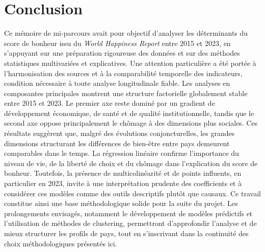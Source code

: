 \documentclass{article}
\begin{document}
\section{Conclusion}

Ce mémoire de mi-parcours avait pour objectif d’analyser les déterminants du score de bonheur issu du \textit{World Happiness Report} entre 2015 et 2023, en s’appuyant sur une préparation rigoureuse des données et sur des méthodes statistiques multivariées et explicatives. Une attention particulière a été portée à l’harmonisation des sources et à la comparabilité temporelle des indicateurs, condition nécessaire à toute analyse longitudinale fiable.
Les analyses en composantes principales montrent une structure factorielle globalement stable entre 2015 et 2023. Le premier axe reste dominé par un gradient de développement économique, de santé et de qualité institutionnelle, tandis que le second axe oppose principalement le chômage à des dimensions plus sociales. Ces résultats suggèrent que, malgré des évolutions conjoncturelles, les grandes dimensions structurant les différences de bien-être entre pays demeurent comparables dans le temps.
La régression linéaire confirme l’importance du niveau de vie, de la liberté de choix et du chômage dans l’explication du score de bonheur. Toutefois, la présence de multicolinéarité et de points influents, en particulier en 2023, invite à une interprétation prudente des coefficients et à considérer ces modèles comme des outils descriptifs plutôt que causaux.
Ce travail constitue ainsi une base méthodologique solide pour la suite du projet. Les prolongements envisagés, notamment le développement de modèles prédictifs et l’utilisation de méthodes de clustering, permettront d’approfondir l’analyse et de mieux structurer les profils de pays, tout en s’inscrivant dans la continuité des choix méthodologiques présentés ici.

\newpage
\printbibliography
\end{document}
